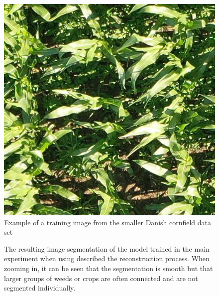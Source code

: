 \documentclass{article}
\begin{document}
\begin{figure}[h!]
	\centering
	\includegraphics[width=0.7\linewidth]{corn}
	\caption{Example of a training image from the smaller Danish cornfield data set}
	\label{fig:corn}
\end{figure}


\begin{figure}[h!]
	\centering
	\caption{The resulting image segmentation of the model trained in the main experiment when using described the reconstruction process. When zooming in, it can be seen that the segmentation is smooth but that larger groups of weeds or crops are often connected and are not segmented individually. }
	\label{fig:inf}
\end{figure}
\end{document}
